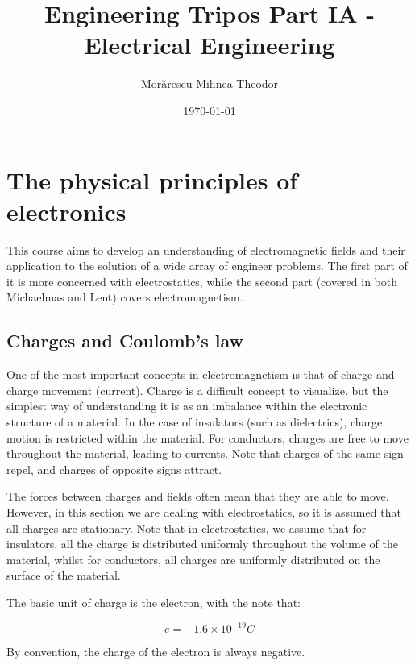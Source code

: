 \documentclass{article}
\begin{document}
\title{Engineering Tripos Part IA - Electrical Engineering}
\author{Morărescu Mihnea-Theodor}
\date{\today}

\maketitle

\newpage

\tableofcontents

\newpage

\section{The physical principles of electronics}

This course aims to develop an understanding of electromagnetic fields and their application to the solution of a wide array of engineer problems. The first part of it is more concerned with electrostatics, while the second part (covered in both Michaelmas and Lent) covers electromagnetism.

\subsection{Charges and Coulomb's law}

One of the most important concepts in electromagnetism is that of charge and charge movement (current). Charge is a difficult concept to visualize, but the simplest way of understanding it is as an imbalance within the electronic structure of a material. In the case of insulators (such as dielectrics), charge motion is restricted within the material. For conductors, charges are free to move throughout the material, leading to currents. Note that charges of the same sign repel, and charges of opposite signs attract.

The forces between charges and fields often mean that they are able to move. However, in this section we are dealing with electrostatics, so it is assumed that all charges are stationary. Note that in electrostatics, we assume that for insulators, all the charge is distributed uniformly throughout the volume of the material, whilst for conductors, all charges are uniformly distributed on the surface of the material.

The basic unit of charge is the electron, with the note that:

\[ e = -1.6 \times 10^{-19} C \]

By convention, the charge of the electron is always negative.
\end{document}
